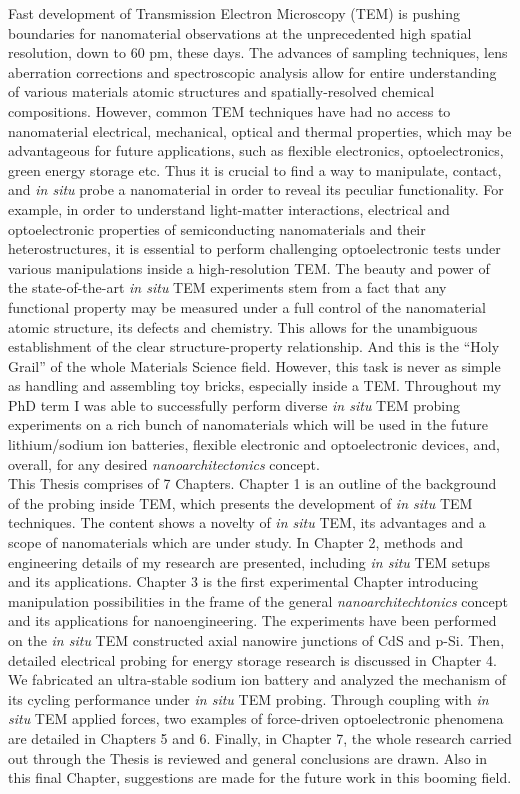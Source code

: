 \justify

\setcounter{page}{5}

Fast development of Transmission Electron Microscopy (TEM) is pushing boundaries for nanomaterial observations at the unprecedented high spatial resolution, down to 60 pm, these days. The advances of sampling techniques, lens aberration corrections and spectroscopic analysis allow for entire understanding of various materials atomic structures and spatially-resolved chemical compositions. However, common TEM techniques have had no access to nanomaterial electrical, mechanical, optical and thermal properties, which may be advantageous for future applications, such as flexible electronics, optoelectronics, green energy storage etc. Thus it is crucial to find a way to manipulate, contact, and \textit{in situ} probe a nanomaterial in order to reveal its peculiar functionality. For example, in order to understand light-matter interactions, electrical and optoelectronic properties of semiconducting nanomaterials and their heterostructures, it is essential to perform challenging optoelectronic tests under various manipulations inside a high-resolution TEM. The beauty and power of the state-of-the-art \textit{in situ} TEM experiments stem from a fact that any functional property may be measured under a full control of the nanomaterial atomic structure, its defects and chemistry. This allows for the unambiguous establishment of the clear structure-property relationship. And this is the “Holy Grail” of the whole Materials Science field. However, this task is never as simple as handling and assembling toy bricks, especially inside a TEM. Throughout my PhD term I was able to successfully perform diverse \textit{in situ} TEM probing experiments on a rich bunch of nanomaterials which will be used in the future lithium/sodium ion batteries, flexible electronic and optoelectronic devices, and, overall, for any desired \textit{nanoarchitectonics} concept. \\
This Thesis comprises of 7 Chapters. Chapter 1 is an outline of the background of the probing inside TEM, which presents the development of \textit{in situ} TEM techniques. The content shows a novelty of {\it in situ} TEM, its advantages and a scope of nanomaterials which are under study. In Chapter 2, methods and engineering details of my research are presented, including {\it in situ} TEM setups and its applications. Chapter 3 is the first experimental Chapter introducing manipulation possibilities in the frame of the general {\it nanoarchitechtonics} concept and its applications for nanoengineering. The experiments have been performed on the {\it in situ} TEM constructed axial nanowire junctions of CdS and p-Si. Then, detailed electrical probing for energy storage research is discussed in Chapter 4. We fabricated an ultra-stable sodium ion battery and analyzed the mechanism of its cycling performance under {\it in situ} TEM probing. Through coupling with {\it in situ} TEM applied forces, two examples of force-driven optoelectronic phenomena are detailed in Chapters 5 and 6. Finally, in Chapter 7, the whole research carried out through the Thesis is reviewed and general conclusions are drawn. Also in this final Chapter, suggestions are made for the future work in this booming field. 
